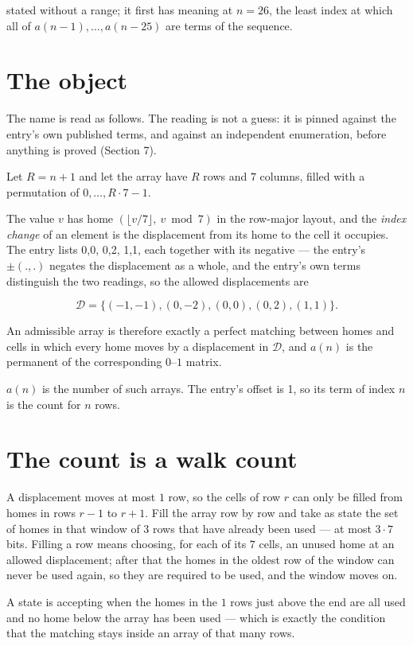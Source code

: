 \documentclass[11pt]{article}
\theoremstyle{definition}
\begin{document}
stated without a range; it first has meaning at $n = 26$, the least index at which all of $a(n-1),\dots,a(n-25)$ are terms of the sequence.

\section{The object}

The name is read as follows. The reading is not a guess: it is pinned against the entry's own published terms, and against an independent enumeration, before anything is proved (Section 7).

Let $R = n + 1$ and let the array have $R$ rows and $7$ columns, filled with a permutation of $0,\dots,R\cdot7-1$.

The value $v$ has home $(\lfloor v/7\rfloor,\ v \bmod 7)$ in the row-major layout, and the {\itshape index change} of an element is the displacement from its home to the cell it occupies. The entry lists 0,0, 0,2, 1,1, each together with its negative --- the entry's $\pm(.,.)$ negates the displacement as a whole, and the entry's own terms distinguish the two readings, so the allowed displacements are

\[\mathcal{D} = \{(-1,-1), (0,-2), (0,0), (0,2), (1,1)\}.\]

An admissible array is therefore exactly a perfect matching between homes and cells in which every home moves by a displacement in $\mathcal{D}$, and $a(n)$ is the permanent of the corresponding $0$--$1$ matrix.

$a(n)$ is the number of such arrays. The entry's offset is 1, so its term of index $n$ is the count for $n$ rows.

\section{The count is a walk count}

A displacement moves at most $1$ row, so the cells of row $r$ can only be filled from homes in rows $r-1$ to $r+1$. Fill the array row by row and take as state the set of homes in that window of $3$ rows that have already been used --- at most $3\cdot7$ bits. Filling a row means choosing, for each of its $7$ cells, an unused home at an allowed displacement; after that the homes in the oldest row of the window can never be used again, so they are required to be used, and the window moves on.

A state is accepting when the homes in the $1$ rows just above the end are all used and no home below the array has been used --- which is exactly the condition that the matching stays inside an array of that many rows.
\end{document}
